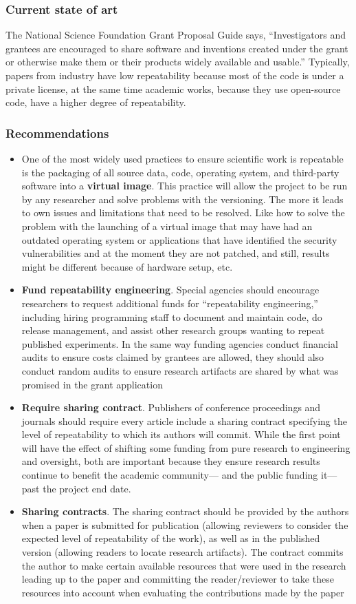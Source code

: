 \documentclass{vldb}
\begin{document}
\subsubsection{Current state of art}
The National Science Foundation Grant Proposal Guide\cite{nfsgp} says, “Investigators and grantees are encouraged to share software and inventions created under the grant or otherwise make them or their products widely available and usable.” 
Typically, papers from industry have low repeatability because most of the code is under a private license, at the same time academic works, because they use open-source code, have a higher degree of repeatability.
\subsubsection{Recommendations}
\begin{itemize}
    \item One of the most widely used practices to ensure scientific work is repeatable is the packaging of all source data, code, operating system, and third-party software into a \textbf{virtual image}. This practice will allow the project to be run by any researcher and solve problems with the versioning. The more it leads to own issues and limitations that need to be resolved. Like how to solve the problem with the launching of a virtual image that may have had an outdated operating system or applications that have identified the security vulnerabilities and at the moment they are not patched, and still, results might be different because of hardware setup, etc.
    \item \textbf{Fund repeatability engineering}. Special agencies should encourage researchers to request additional funds for “repeatability engineering,” including hiring programming staff to document and maintain code, do release management, and assist other research groups wanting to repeat published experiments. In the same way funding agencies conduct financial audits to ensure costs claimed by grantees are allowed, they should also conduct random audits to ensure research artifacts are shared by what was promised in the grant application
    \item \textbf{Require sharing contract}. Publishers of conference proceedings and journals should require every article include a sharing contract specifying the level of repeatability to which its authors will commit. While the first point will have the effect of shifting some funding from pure research to engineering and oversight, both are important because they ensure research results continue to benefit the academic community— and the public funding it—past the project end date. 
    \item \textbf{Sharing contracts}. The sharing contract should be provided by the authors when a paper is submitted for publication (allowing reviewers to consider the expected level of repeatability of the work), as well as in the published version (allowing readers to locate research artifacts). The contract commits the author to make certain available resources that were used in the research leading up to the paper and committing the reader/reviewer to take these resources into account when evaluating the contributions made by the paper
\end{itemize}
\end{document}
